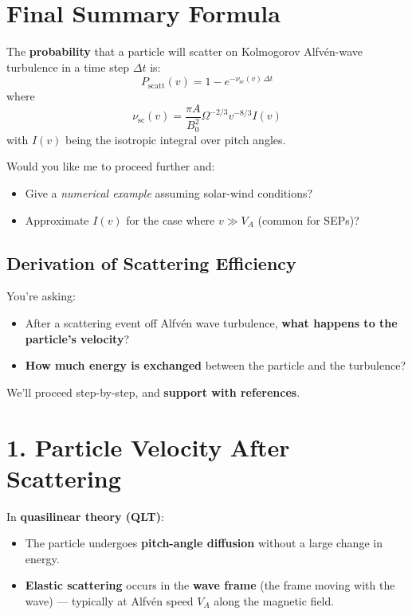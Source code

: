 \hrulefill

\section*{\texorpdfstring{ \textbf{Final Summary Formula}}{}}

The \textbf{probability} that a particle will scatter on Kolmogorov Alfvén-wave turbulence in a time step $\Delta t$ is:
\begin{equation}
\boxed{P_{\text{scatt}}(v) = 1 - e^{-\nu_{\text{sc}}(v)\,\Delta t}}
\end{equation}
where
\begin{equation}
\boxed{\nu_{\text{sc}}(v) = \frac{\pi A}{B_0^2} \Omega^{-2/3} v^{-8/3} I(v)}
\end{equation}
with $I(v)$ being the isotropic integral over pitch angles.

\hrulefill

Would you like me to proceed further and:
\begin{itemize}
    \item Give a \textit{numerical example} assuming solar-wind conditions?
    \item Approximate $I(v)$ for the case where $v \gg V_A$ (common for SEPs)?
\end{itemize}


\subsection{Derivation of Scattering Efficiency}




You’re asking:
\begin{itemize}
    \item After a scattering event off Alfvén wave turbulence, \textbf{what happens to the particle’s velocity}?
    \item \textbf{How much energy is exchanged} between the particle and the turbulence?
\end{itemize}

We’ll proceed step-by-step, and \textbf{support with references}.

\hrulefill

\section*{\texorpdfstring{\textbf{1. Particle Velocity After Scattering}}{}}

In \textbf{quasilinear theory (QLT)}:
\begin{itemize}
    \item The particle undergoes \textbf{pitch-angle diffusion} without a large change in energy.
    \item \textbf{Elastic scattering} occurs in the \textbf{wave frame} (the frame moving with the wave) --- typically at Alfvén speed $V_A$ along the magnetic field.
\end{itemize}

